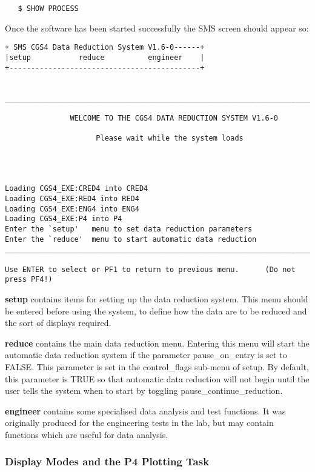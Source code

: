 {\begin{verbatim}
   $ SHOW PROCESS
\end{verbatim}

Once the software has been started successfully the SMS screen should appear so:

\begin{verbatim} 
+ SMS CGS4 Data Reduction System V1.6-0------+
|setup           reduce          engineer    |
+--------------------------------------------+


_______________________________________________________________________________

               WELCOME TO THE CGS4 DATA REDUCTION SYSTEM V1.6-0

                     Please wait while the system loads




Loading CGS4_EXE:CRED4 into CRED4
Loading CGS4_EXE:RED4 into RED4
Loading CGS4_EXE:ENG4 into ENG4
Loading CGS4_EXE:P4 into P4
Enter the `setup'   menu to set data reduction parameters
Enter the `reduce'  menu to start automatic data reduction
_______________________________________________________________________________

Use ENTER to select or PF1 to return to previous menu.      (Do not press PF4!)
\end{verbatim}

{\bf setup} contains items for setting up the data reduction system.
This menu should be entered before using the system,
to define how the data are to be reduced and the sort of displays 
required.

{\bf reduce} contains the main data reduction menu. Entering this menu
will start the automatic data reduction system if the parameter
{\sf pause\_on\_entry} is set to {\sf FALSE}. This parameter is set in the
{\sf control\_flags} sub-menu of {\sf setup}. By default, this parameter
is {\sf TRUE} so that automatic data reduction will not begin until the 
user tells the system when to start by toggling 
{\sf pause\_continue\_reduction}.

{\bf engineer} contains some specialised data analysis and test 
functions. It was originally produced for the engineering tests in 
the lab, but may contain functions which are useful for data analysis.

\subsubsection{Display Modes and the P4 Plotting Task}
\label{display_modes_and_the_p4_plotting_task}

}

